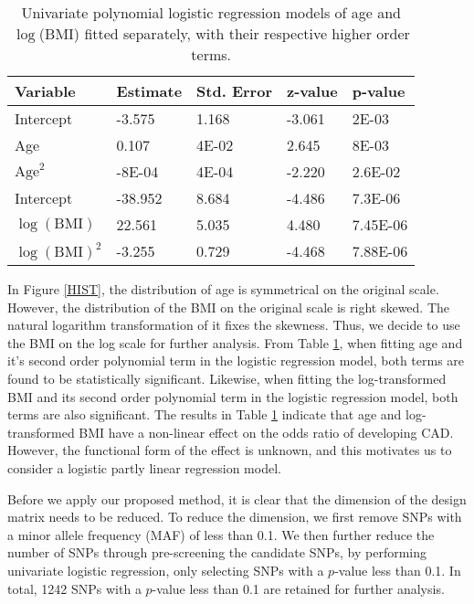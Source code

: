 \documentclass[11pt]{article}
\begin{document}
\begin{table}
\centering
\caption{Univariate polynomial logistic regression models of age and $\log$(BMI) fitted separately, with their respective higher order terms.} \label{Uni}
\begin{tabular}{l|llll}
\hline
Variable & Estimate & Std. Error & z-value & p-value \\
\hline
Intercept & -3.575 & 1.168 & -3.061 & 2E-03\\
Age & 0.107 & 4E-02 & 2.645 & 8E-03 \\
$\text{Age}^2$ & -8E-04 & 4E-04 & -2.220 & 2.6E-02 \\
\hline
Intercept & -38.952 & 8.684 &-4.486 & 7.3E-06 \\
$\log(\text{BMI})$ & 22.561 & 5.035 & 4.480 & 7.45E-06 \\
$\log(\text{BMI})^2$ & -3.255 &0.729 & -4.468 & 7.88E-06 \\
\hline
\end{tabular}
\end{table}
In Figure \ref{HIST}, the distribution of age is symmetrical on the original scale. However, the distribution of the BMI on the original scale is right skewed. The natural logarithm transformation of it fixes the skewness. Thus, we decide to use the BMI on the log scale for further analysis. From Table \ref{Uni}, when fitting age and it's second order polynomial term in the logistic regression model, both terms are found to be statistically significant. Likewise, when fitting the log-transformed BMI and its second order polynomial term in the logistic regression model, both terms are also significant. The results in Table \ref{Uni} indicate that age and log-transformed BMI have a non-linear effect on the odds ratio of developing CAD. However, the functional form of the effect is unknown, and this motivates us to consider a logistic partly linear regression model. 

Before we apply our proposed method, it is clear that the dimension of the design matrix needs to be reduced. To reduce the dimension, we first remove SNPs with a minor allele frequency (MAF) of less than 0.1. We then further reduce the number of SNPs through pre-screening the candidate SNPs, by performing univariate logistic regression, only selecting SNPs with a $p$-value less than 0.1. In total, 1242 SNPs with a $p$-value less than 0.1 are retained for further analysis.
\end{document}
